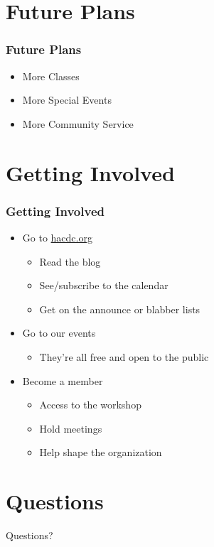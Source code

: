 \documentclass[notes]{beamer}
\begin{document}
\section{Future Plans}

\begin{frame}
  \frametitle{Future Plans}
  \begin{itemize}
  \item More Classes
  \item More Special Events
  \item More Community Service
  \end{itemize}
\end{frame}

\section{Getting Involved}

\begin{frame}
  \frametitle{Getting Involved}
  \begin{itemize}
  \item Go to \href{http://hacdc.org}{hacdc.org}
    \begin{itemize}
    \item Read the blog
    \item See/subscribe to the calendar
    \item Get on the announce or blabber lists
    \end{itemize}
  \item Go to our events
    \begin{itemize}
    \item They're all free and open to the public
    \end{itemize}
  \item Become a member
    \begin{itemize}
    \item Access to the workshop
    \item Hold meetings
    \item Help shape the organization
    \end{itemize}
  \end{itemize}
\end{frame}

\section{Questions}

\begin{frame}
  \begin{center}
    {\Large Questions?}
  \end{center}
\end{frame}
\end{document}
